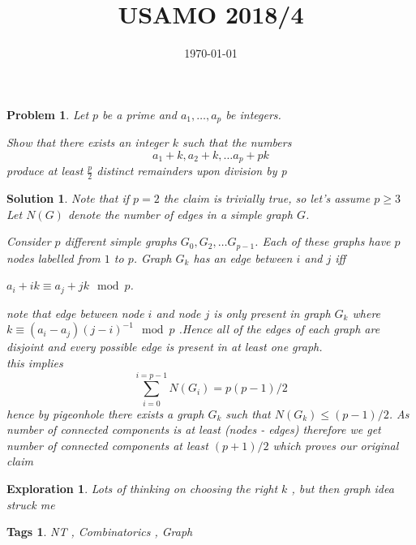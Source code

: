 \documentclass{article}
\title{USAMO 2018/4}
\date{\today}
\newtheorem*{problem}{Problem}
\newtheorem*{solution}{Solution}
\newtheorem*{exploration}{Exploration}
\newtheorem*{tags}{Tags}
\begin{document}
	
	\maketitle
	
	\begin{problem}
		Let $p$ be a prime and $a_1, \dots , a_p$ be integers. 
		
		Show that there exists an integer $k$ such that the numbers 
		\[
		a_1 +k , a_2 +k, \dots a_p + pk
		\]
		produce at least $\frac{p}{2}$ distinct remainders upon division by p
	\end{problem}
	
	\begin{solution}
		Note that if $p=2$ the claim is trivially true, so let's assume $p \geq 3$
		Let $N(G)$ denote the number of edges in a simple graph $G$.
		
		Consider $p$ different simple graphs $G_0,G_2 , \dots G_{p-1}$.  Each of these graphs have $p$ nodes labelled from $1$ to $p$. Graph $G_k$ has an edge between $i$ and $j$ iff 
		
		$a_i + ik \equiv a_j + jk \mod p$.
		
		note that edge between node $i$ and node $j$ is only present in graph $G_k$ where $k \equiv (a_i - a_j)(j-i)^{-1} \mod p$ .Hence all of the edges of each graph are disjoint and every possible edge is present in at least one graph.
		\\
		this implies
		\[
		\sum_{i=0}^{i=p-1} N(G_i) = p(p-1)/2
		\]
		hence by pigeonhole there exists a graph $G_k$ such that $N(G_k) \leq (p-1)/2$. As number of connected components is at least (nodes - edges) therefore we get number of connected components at least $(p+1)/2$ which proves our original claim
		
	\end{solution}
	
	\begin{exploration}
		Lots of thinking on choosing the right $k$ , but then graph idea struck me
	\end{exploration}
	
	\begin{tags}
		NT , Combinatorics , Graph 
	\end{tags}
	
\end{document}
